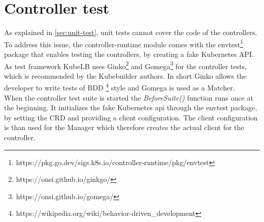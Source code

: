 \section{Controller test}\label{sec:controller-test}

As explained in \autoref{sec:unit-test}, unit tests cannot cover the code of the controllers.
To address this issue, the controller-runtime module comes with the envtest\footnote{https://pkg.go.dev/sigs.k8s.io/controller-runtime/pkg/envtest} package that enables testing the controllers, by creating a fake Kubernetes API.
As test framework KubeLB uses Ginko\footnote{https://onsi.github.io/ginkgo/} and Gomega\footnote{https://onsi.github.io/gomega/} for the controller tests, which is recommended by the Kubebuilder authors.
In short Ginko allows the developer to write tests of BDD \footnote{https://wikipedia.org/wiki/behavior-driven\_development} style and Gomega is used as a Matcher.
\\
When the controller test suite is started the \textit{BeforeSuite()} function runs once at the beginning.
It initializes the fake Kubernetes api through the envtest package, by setting the CRD and providing a client configuration.
The client configuration is than used for the Manager which therefore creates the actual client for the controller.
